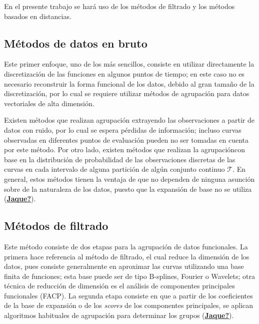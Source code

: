 \documentclass[
]{book}
\begin{document}
En el presente trabajo se hará uso de los métodos de filtrado y los métodos basados en distancias.

\hypertarget{muxe9todos-de-datos-en-bruto}{%
\subsection{Métodos de datos en bruto}\label{muxe9todos-de-datos-en-bruto}}

Este primer enfoque, uno de los más sencillos, consiste en utilizar directamente la discretización de las funciones en algunos puntos de tiempo; en este caso no es necesario reconstruir la forma funcional de los datos, debido al gran tamaño de la discretización, por lo cual se requiere utilizar métodos de agrupación para datos vectoriales de alta dimensión.

Existen métodos que realizan agrupación extrayendo las observaciones a partir de datos con ruido, por lo cual se espera pérdidas de información; incluso curvas observadas en diferentes puntos de evaluación pueden no ser tomadas en cuenta por este método. Por otro lado, existen métodos que realizan la agrupacióncon base en la distribución de probabilidad de las observaciones discretas de las curvas en cada intervalo de alguna partición de algún conjunto continuo \(\mathcal{T}\). En general, estos métodos tienen la ventaja de que no dependen de ninguna asunción sobre de la naturaleza de los datos, puesto que la expansión de base no se utiliza (\protect\hyperlink{ref-Jaque}{\textbf{Jaque?}}).

\hypertarget{muxe9todos-de-filtrado}{%
\subsection{Métodos de filtrado}\label{muxe9todos-de-filtrado}}

Este método consiste de dos etapas para la agrupación de datos funcionales. La primera hace referencia al método de filtrado, el cual reduce la dimensión de los datos, pues consiste generalmente en aproximar las curvas utilizando una base finita de funciones; esta base puede ser de tipo B-splines, Fourier o Wavelets; otra técnica de reducción de dimensión es el análisis de componentes principales funcionales (FACP). La segunda etapa consiste en que a partir de los coeficientes de la base de expansión o de los \emph{scores} de los componentes principales, se aplican algoritmos habituales de agrupación para determinar los grupos (\protect\hyperlink{ref-Jaque}{\textbf{Jaque?}}).
\end{document}
